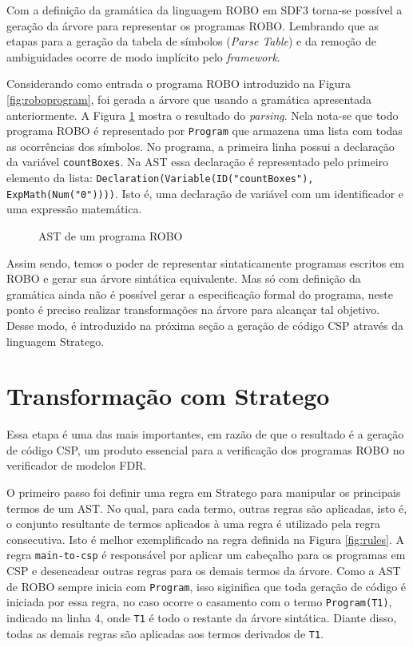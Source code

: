 Com a definição da gramática da linguagem ROBO em SDF3 torna-se possível a geração da árvore para representar os programas ROBO. Lembrando que as etapas para a geração da tabela de símbolos (\textit{Parse Table}) e da remoção de ambiguidades ocorre de modo implícito pelo \textit{framework}. 

Considerando como entrada o programa ROBO introduzido na Figura \ref{fig:roboprogram}, foi gerada a árvore que usando a gramática apresentada anteriormente. A Figura \ref{fig:ast1} mostra o resultado do \textit{parsing}. Nela nota-se que todo programa ROBO é representado por \texttt{Program} que armazena uma lista com todas as ocorrências dos símbolos. No programa, a primeira linha possui a declaração da variável \texttt{countBoxes}. Na AST essa declaração é representado pelo primeiro elemento da lista: \texttt{Declaration(Variable(ID("countBoxes"), ExpMath(Num("0"))))}. Isto é, uma declaração de variável com um identificador e uma expressão matemática.

\begin{figure}[h]
\centering
\caption{AST de um programa ROBO}

\label{fig:ast1}
\end{figure}

Assim sendo, temos o poder de representar sintaticamente programas escritos em ROBO e gerar sua árvore sintática equivalente. Mas só com definição da gramática ainda não é possível gerar a especificação formal do programa, neste ponto é preciso realizar transformações na árvore para alcançar tal objetivo. Desse modo, é introduzido na próxima seção a geração de código CSP através da linguagem Stratego.

\section{Transformação com Stratego}

Essa etapa é uma das mais importantes, em razão de que o resultado é a geração de código CSP, um produto essencial para a verificação dos programas ROBO no verificador de modelos FDR.

O primeiro passo foi definir uma regra em Stratego para manipular os principais termos de um AST. No qual, para cada termo, outras regras são aplicadas, isto é, o conjunto resultante de termos aplicados à uma regra é utilizado pela regra consecutiva. Isto é melhor exemplificado na regra definida na Figura \ref{fig:rules}. A regra \texttt{main-to-csp} é responsável por aplicar um cabeçalho para os programas em CSP e desencadear outras regras para os demais termos da árvore. Como a AST de ROBO sempre inicia com \texttt{Program}, isso siginifica que toda geração de código é iniciada por essa regra, no caso ocorre o casamento com o termo \texttt{Program(T1)}, indicado na linha 4, onde \texttt{T1} é todo o restante da árvore sintática. Diante disso, todas as demais regras são aplicadas aos termos derivados de \texttt{T1}.


